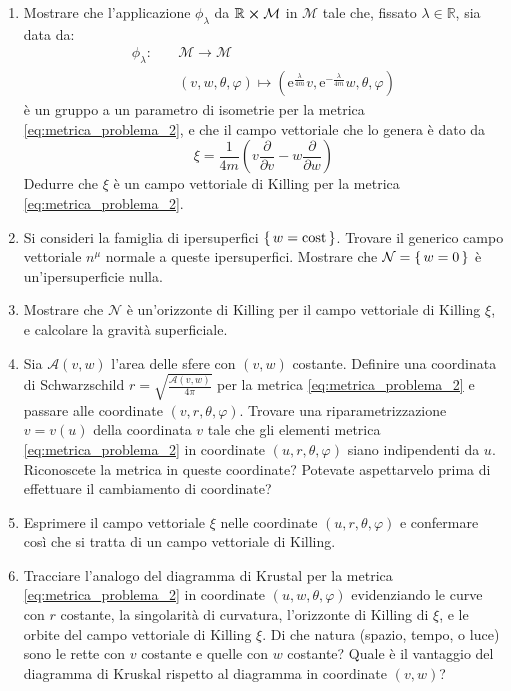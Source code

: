 \documentclass[]{scrartcl}
\newcommand{\me}{\mathrm{e}}
\newcommand{\pfrac}[1]{\frac{\partial}{\partial #1}}
\newcommand{\cost}{\mathrm{cost}}
\begin{document}
\begin{enumerate}
\item Mostrare che l'applicazione $ \phi_\lambda $ da $ \mathbb{R} \cross \mathcal{M} $ in $ \mathcal{M} $ tale che,
  fissato $ \lambda \in \mathbb{R} $, sia data da:
  \begin{align*}
    \label{eq:phi_lambda}
    \phi_\lambda : & \quad \mathcal{M} \rightarrow \mathcal{M} \\
                   & \quad \left( v,w,\theta,\varphi \right) \mapsto \left( \me^\frac{\lambda}{4m} v, \me^{-\frac{\lambda}{4m}} w, \theta, \varphi  \right)
  \end{align*}
  è un gruppo a un parametro di isometrie per la metrica \eqref{eq:metrica_problema_2}, e che il campo vettoriale
  che lo genera è dato da
  \begin{equation}
    \label{eq:campo_vettoriale}
    \xi = \frac{1}{4 m} \left( v \pfrac{v} - w \pfrac{w} \right)
  \end{equation}
  Dedurre che $ \xi $ è un campo vettoriale di Killing per la metrica \eqref{eq:metrica_problema_2}.
\item Si consideri la famiglia di ipersuperfici $ \set{ w = \cost } $. Trovare il generico campo
  vettoriale $ n^\mu $ normale a queste ipersuperfici. Mostrare che $ \mathcal{N} = \set{ w = 0} $ è un'ipersuperficie nulla.
\item Mostrare che $ \mathcal{N} $ è un'orizzonte di Killing per il campo vettoriale di Killing $ \xi $, e calcolare la
  gravità superficiale.
\item Sia $ \mathcal{A}(v,w) $ l'area delle sfere con $ (v,w) $ costante. Definire una coordinata di Schwarzschild
  $ r = \sqrt{\frac{\mathcal{A}(v,w)}{4\pi}} $ per la metrica \eqref{eq:metrica_problema_2} e passare alle coordinate
  $ (v,r,\theta,\varphi) $. Trovare una riparametrizzazione $ v = v(u) $ della coordinata $ v $ tale che gli elementi metrica
  \eqref{eq:metrica_problema_2} in coordinate $ (u, r, \theta, \varphi) $ siano indipendenti da $ u $. Riconoscete la metrica
  in queste coordinate? Potevate aspettarvelo prima di effettuare il cambiamento di coordinate?
\item Esprimere il campo vettoriale $ \xi $ nelle coordinate $ (u,r,\theta,\varphi) $ e confermare così che si tratta di un
  campo vettoriale di Killing.
\item Tracciare l'analogo del diagramma di Krustal per la metrica \eqref{eq:metrica_problema_2} in coordinate $ (u,w,\theta,\varphi) $
  evidenziando le curve con $ r $ costante, la singolarità di curvatura, l'orizzonte di Killing di $ \xi $, e le orbite del campo
  vettoriale di Killing $ \xi $. Di che natura (spazio, tempo, o luce) sono le rette con $ v $ costante e quelle con $ w $ costante?
  Quale è il vantaggio del diagramma di Kruskal rispetto al diagramma in coordinate $ (v,w) $?
\end{enumerate}
\end{document}
